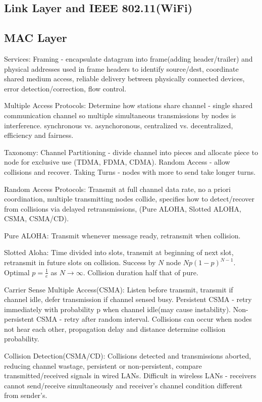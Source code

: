 \documentclass[9pt]{extarticle}
\begin{document}
\begin{multicols}{2}
\section{Link Layer and IEEE 802.11(WiFi)}

\subsection{MAC Layer}

Services: Framing - encapsulate datagram into frame(adding header/trailer) and physical addresses used in frame headers to identify source/dest, coordinate shared medium access, reliable delivery between physically
connected devices, error detection/correction, flow control.

Multiple Access Protocols: Determine how stations share channel - single shared communication channel so multiple simultaneous transmissions by nodes is interference. synchronous vs. asynchoronous, centralized vs. decentralized, efficiency and fairness.

Taxonomy: Channel Partitioning - divide channel into pieces and allocate piece to node for exclusive use (TDMA, FDMA, CDMA). Random Access - allow collisions and recover. Taking Turns - nodes with more to send take longer turns.

Random Access Protocols: Transmit at full channel data rate, no a priori coordination, multiple transmitting nodes collide, specifies how to detect/recover from collisions via delayed retransmissions, (Pure ALOHA, Slotted ALOHA, CSMA, CSMA/CD).

Pure ALOHA: Transmit whenever  message ready, retransmit when collision.

Slotted Aloha: Time divided into slots, transmit at beginning of next slot, retransmit in future slots on collision. Success by $N$ node $Np(1-p)^{N-1}$. Optimal $p=\frac{1}{e}$ as $N\rightarrow{\infty}$. Collision duration half that of pure.

Carrier Sense Multiple Access(CSMA): Listen before transmit, transmit if channel idle, defer transmission if channel sensed busy. Persistent CSMA - retry immediately with probability p when channel idle(may cause instability). Non-persistent CSMA - retry after random interval. Collisions can occur when nodes not hear each other, propagation delay and distance determine collision probability.

Collision Detection(CSMA/CD): Collisions detected and transmissions aborted, reducing channel
wastage, persistent or non-persistent, compare transmitted/received signals in wired LANs. Difficult in wireless LANs -  receivers cannot send/receive simultaneously and receiver’s channel condition different from sender's.


\end{multicols}
\end{document}
